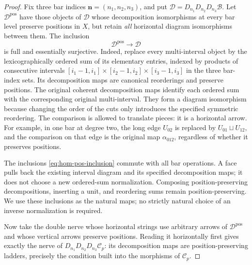 \begin{proof}
Fix three bar indices $\boldsymbol n=(n_1,n_2,n_3)$, and put
$\mathcal D=D_{n_1}D_{n_2}D_{n_3}\mathcal B$.
Let $\mathcal D^{\mathrm{pos}}$ have those objects of
$\mathcal D$ whose decomposition isomorphisms at every bar level
preserve positions in $X$, but retain \emph{all} horizontal diagram isomorphisms
between them.  The inclusion
\begin{equation}\label{eq:hom-pos-inclusion}
 \mathcal D^{\mathrm{pos}}\longrightarrow\mathcal D
\end{equation}
is full and essentially surjective.  Indeed, replace every
multi-interval object by the lexicographically ordered sum of its
elementary entries, indexed by products of consecutive intervals
$[i_1-1,i_1]\times[i_2-1,i_2]\times[i_3-1,i_3]$ in the three
bar-index sets.  Its decomposition maps are
canonical reorderings and preserve positions.  The original
coherent decomposition maps identify each ordered sum with the
corresponding original multi-interval.  They form a diagram
isomorphism because changing the order of the cuts only introduces
the specified symmetric reordering.  The comparison is allowed to
translate pieces: it is a horizontal arrow.  For example, in one
bar at degree two, the long edge $U_{02}$ is replaced by
$U_{01}\sqcup U_{12}$, and the comparison on that edge is the
original map $\alpha_{012}$, regardless of whether it preserves
positions.

The inclusions \eqref{eq:hom-pos-inclusion} commute with all bar
operations.  A face pulls back the existing interval diagram and its
specified decomposition maps; it does not choose a new ordered-sum
normalization.  Composing position-preserving decompositions,
inserting a unit, and reordering sums remain position-preserving.
We use these inclusions as the natural maps; no strictly natural
choice of an inverse normalization is required.

Now take the double nerve whose horizontal strings use arbitrary
arrows of $\mathcal D^{\mathrm{pos}}$ and whose vertical arrows
preserve positions.  Reading it horizontally first gives exactly
the nerve of $D_{n_1}D_{n_2}D_{n_3}\mathcal C_p$: its
decomposition maps are position-preserving ladders, precisely the
condition built into the morphisms of $\mathcal C_p$.


\end{proof}
